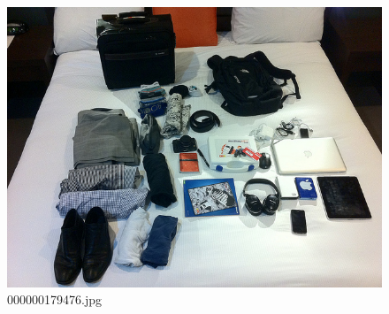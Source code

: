 \begin{figure}[h]
    \centering
    \includegraphics[width=0.8\linewidth]{../image set/hard/000000179476.jpg}
    \caption{000000179476.jpg}
\end{figure}
